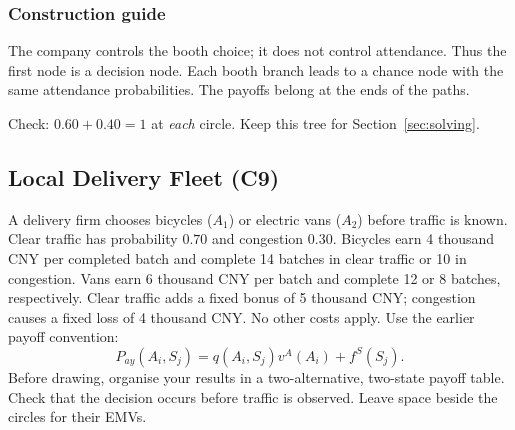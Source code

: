 \subsubsection*{Construction guide}\label{task:booth-elements}
The company controls the booth choice; it does not control attendance. Thus the first node is a decision node. Each booth branch leads to a chance node with the same attendance probabilities. The payoffs belong at the ends of the paths.
\label{task:booth-tree}
\begin{center}
\end{center}
Check: $0.60+0.40=1$ at \emph{each} circle. Keep this tree for Section~\ref{sec:solving}.

\subsection{Local Delivery Fleet (C9)}\label{sec:fleet}
A delivery firm chooses bicycles ($A_1$) or electric vans ($A_2$) before traffic is known. Clear traffic has probability $0.70$ and congestion $0.30$. Bicycles earn 4 thousand CNY per completed batch and complete 14 batches in clear traffic or 10 in congestion. Vans earn 6 thousand CNY per batch and complete 12 or 8 batches, respectively. Clear traffic adds a fixed bonus of 5 thousand CNY; congestion causes a fixed loss of 4 thousand CNY. No other costs apply.
\label{task:fleet}
Use the earlier payoff convention:
\[
P_{ay}(A_i,S_j)=q(A_i,S_j)v^A(A_i)+f^S(S_j).
\]
Before drawing, organise your results in a two-alternative, two-state payoff table. Check that the decision occurs before traffic is observed. Leave space beside the circles for their EMVs.

